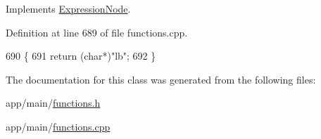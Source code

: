 Implements \hyperlink{classExpressionNode_a42a5e9562b0f645a19dcc83f698069b5}{Expression\+Node}.



Definition at line 689 of file functions.\+cpp.


\begin{DoxyCode}
690 \{
691     \textcolor{keywordflow}{return} (\textcolor{keywordtype}{char}*)\textcolor{stringliteral}{"lb"};
692 \}
\end{DoxyCode}


The documentation for this class was generated from the following files\+:\begin{DoxyCompactItemize}
\item 
app/main/\hyperlink{functions_8h}{functions.\+h}\item 
app/main/\hyperlink{functions_8cpp}{functions.\+cpp}\end{DoxyCompactItemize}
